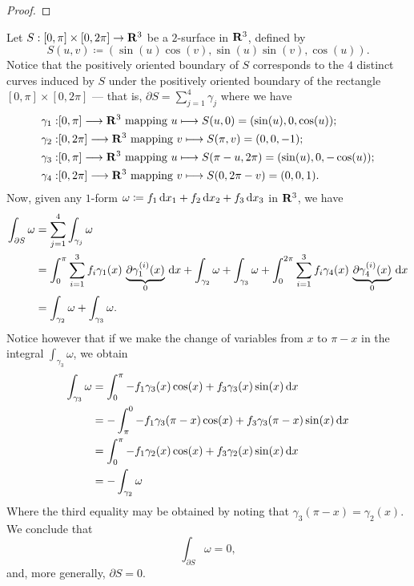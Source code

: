 \begin{proof}
\end{proof}

\begin{example}
    Let \(S: [0, \pi] \times [0, 2\pi] \to \mathbf{R}^3\) be a \(2\)-surface in \(\mathbf{R}^3\),
    defined by
    \[
        S(u, v) \coloneq (\sin(u) \cos(v), \sin(u) \sin(v), \cos(u)).
    \]
    Notice that the positively oriented boundary of \(S\) corresponds to the \(4\)
    distinct curves induced by \(S\) under the positively oriented boundary of the
    rectangle \([0, \pi] \times [0, 2 \pi]\) --- that is, \(\partial S =
    \sum_{j=1}^4 \gamma_j\) where we have
    \begin{align*}
        \gamma_1: & [0, \pi] \longrightarrow \mathbf{R}^3
        \text{ mapping } u \longmapsto S(u, 0) = (\sin(u), 0, \cos(u));            \\
        \gamma_2: & [0, 2 \pi] \longrightarrow \mathbf{R}^3
        \text{ mapping } v \longmapsto S(\pi, v) = (0, 0, -1);                     \\
        \gamma_3: & [0, \pi]\longrightarrow \mathbf{R}^3
        \text{ mapping } u \longmapsto S(\pi - u, 2 \pi) = (\sin(u), 0, -\cos(u)); \\
        \gamma_4: & [0, 2 \pi] \longrightarrow \mathbf{R}^3
        \text{ mapping } v \longmapsto S(0, 2\pi - v) = (0, 0, 1).
    \end{align*}
    Now, given any \(1\)-form \(\omega \coloneq f_1\, \mathrm{d} x_1 + f_2\, \mathrm{d} x_2 +
    f_3\, \mathrm{d} x_3\) in \(\mathbf{R}^3\), we have
    \begin{align*}
        \int_{\partial S} \omega
         & = \sum_{j=1}^4 \int_{\gamma_j} \omega                                \\
         & = \int_0^{\pi} \sum_{i=1}^3
        f_i \gamma_1(x)\, \underbrace{\partial \gamma_1^{(i)}(x)}_{0}\, \mathrm{d} x
        + \int_{\gamma_2} \omega
        + \int_{\gamma_3} \omega
        + \int_0^{2 \pi} \sum_{i=1}^3
        f_i \gamma_4(x)\, \underbrace{\partial \gamma_4^{(i)}(x)}_{0}\, \mathrm{d} x \\
         & = \int_{\gamma_2} \omega + \int_{\gamma_3} \omega.
    \end{align*}
    Notice however that if we make the change of variables from \(x\) to \(\pi - x\)
    in the integral \(\int_{\gamma_3} \omega\), we obtain
    \begin{align*}
        \int_{\gamma_3} \omega
         & = \int_0^{\pi} - f_1 \gamma_3(x) \cos(x) + f_3 \gamma_3(x) \sin(x)\, \mathrm{d} x
        \\
         & = - \int_{\pi}^0 - f_1\gamma_3(\pi - x) \cos(x) + f_{3} \gamma_{3}(\pi - x)
        \sin(x)\, \mathrm{d} x
        \\
         & = \int_0^{\pi} -f_1\gamma_2(x) \cos(x) + f_3\gamma_2(x) \sin(x) \, \mathrm{d} x
        \\
         & = - \int_{\gamma_2} \omega
    \end{align*}
    Where the third equality may be obtained by noting that \(\gamma_3(\pi - x) =
    \gamma_2(x)\). We conclude that
    \[
        \int_{\partial S} \omega = 0,
    \]
    and, more generally, \(\partial S = 0\).
\end{example}

